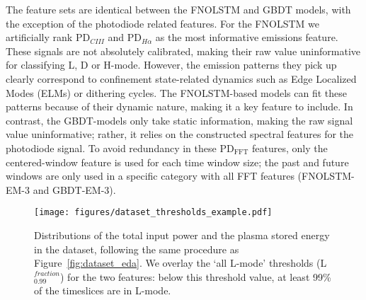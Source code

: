 The feature sets are identical between the FNOLSTM and GBDT models, with the exception of the photodiode related features. For the FNOLSTM we artificially rank $\text{PD}_{\textit{CIII}}^{}$ and $\text{PD}_{\textit{H}\alpha}^{}$ as the most informative emissions feature. These signals are not absolutely calibrated, making their raw value uninformative for classifying L, D or H-mode. However, the emission patterns they pick up clearly correspond to confinement state-related dynamics such as Edge Localized Modes (ELMs) or dithering cycles. The FNOLSTM-based models can fit these patterns because of their dynamic nature, making it a key feature to include. In contrast, the GBDT-models only take static information, making the raw signal value uninformative; rather, it relies on the constructed spectral features for the photodiode signal. To avoid redundancy in these $\text{PD}_{\text{FFT}}$ features, only the centered-window feature is used for each time window size; the past and future windows are only used in a specific category with all FFT features (FNOLSTM-EM-3 and GBDT-EM-3). 

\begin{figure}[h]
\begin{center}\texttt{[image: figures/dataset\_thresholds\_example.pdf]}\end{center}
    \caption{Distributions of the total input power and the plasma stored energy in the dataset, following the same procedure as Figure~\ref{fig:dataset_eda}. We overlay the `all L-mode' thresholds (L$^{\textit{fraction}}_{0.99}$) for the two features: below this threshold value, at least 99\% of the timeslices are in L-mode.}
    \label{fig:thresholds_example}%
\end{figure}

\newpage






\newpage
